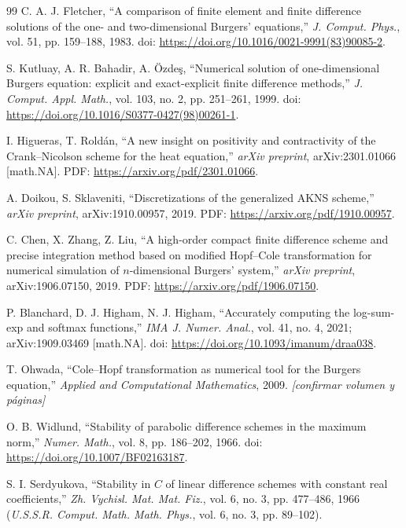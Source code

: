 \documentclass[11pt,letterpaper]{article}
\theoremstyle{plain}
\theoremstyle{definition}
\theoremstyle{remark}
\numberwithin{equation}{section}
\newcommand{\ph}[1]{\textcolor{red!70!black}{\textit{[#1]}}}
\begin{document}
\begin{thebibliography}{99}
		C. A. J. Fletcher, ``A comparison of finite element and finite difference solutions of the one- and two-dimensional Burgers' equations,'' \emph{J. Comput. Phys.}, vol. 51, pp. 159--188, 1983.
		doi: \url{https://doi.org/10.1016/0021-9991(83)90085-2}.
		
		S. Kutluay, A. R. Bahadir, A. {\"O}zde\c{s}, ``Numerical solution of one-dimensional Burgers equation: explicit and exact-explicit finite difference methods,'' \emph{J. Comput. Appl. Math.}, vol. 103, no. 2, pp. 251--261, 1999.
		doi: \url{https://doi.org/10.1016/S0377-0427(98)00261-1}.
		
		I. Higueras, T. Roldán, ``A new insight on positivity and contractivity of the Crank--Nicolson scheme for the heat equation,'' \emph{arXiv preprint}, arXiv:2301.01066 [math.NA].
		PDF: \url{https://arxiv.org/pdf/2301.01066}.
		
		A. Doikou, S. Sklaveniti, ``Discretizations of the generalized AKNS scheme,'' \emph{arXiv preprint}, arXiv:1910.00957, 2019.
		PDF: \url{https://arxiv.org/pdf/1910.00957}.
		
		C. Chen, X. Zhang, Z. Liu, ``A high-order compact finite difference scheme and precise integration method based on modified Hopf--Cole transformation for numerical simulation of $n$-dimensional Burgers' system,'' \emph{arXiv preprint}, arXiv:1906.07150, 2019.
		PDF: \url{https://arxiv.org/pdf/1906.07150}.
		
		P. Blanchard, D. J. Higham, N. J. Higham, ``Accurately computing the log-sum-exp and softmax functions,'' \emph{IMA J. Numer. Anal.}, vol. 41, no. 4, 2021; arXiv:1909.03469 [math.NA].
		doi: \url{https://doi.org/10.1093/imanum/draa038}.
		
		T. Ohwada, ``Cole--Hopf transformation as numerical tool for the Burgers equation,'' \emph{Applied and Computational Mathematics}, 2009. \ph{confirmar volumen y páginas}
		
		O. B. Widlund, ``Stability of parabolic difference schemes in the maximum norm,'' \emph{Numer. Math.}, vol. 8, pp. 186--202, 1966.
		doi: \url{https://doi.org/10.1007/BF02163187}.
		
		S. I. Serdyukova, ``Stability in $C$ of linear difference schemes with constant real coefficients,'' \emph{Zh. Vychisl. Mat. Mat. Fiz.}, vol. 6, no. 3, pp. 477--486, 1966 (\emph{U.S.S.R. Comput. Math. Math. Phys.}, vol. 6, no. 3, pp. 89--102).
		

\end{thebibliography}
\end{document}
